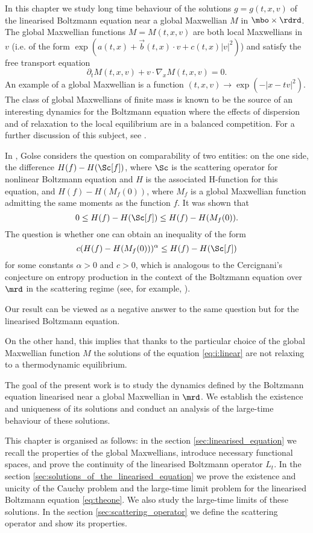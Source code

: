 In this chapter we study long time behaviour of the solutions $g=g(t,x,v)$ of the linearised Boltzmann equation near a global Maxwellian $M$ in $\mbo\times\rdrd$. The global Maxwellian functions $M=M(t,x,v)$ are both local Maxwellians in $v$ (i.e. of the form $\exp (a(t,x)+\vec b(t,x)\cdot v + c(t,x)|v|^2)$) and satisfy the free transport equation \[\partial_t M(t,x,v)+v\cdot\nabla_x M(t,x,v)=0.\]
An example of a global Maxwellian is a function $(t,x,v)\to \exp(-|x-tv|^2)$.
The class of global Maxwellians of finite mass is known to be the source of an interesting dynamics for the Boltzmann equation where the effects of dispersion and of relaxation to the local equilibrium are in a balanced competition. For a further discussion of this subject, see \cite{FG}. 


In \cite{Golse2015Dispersion}, Golse considers the question on comparability of two entities: on the one side, the difference $H(f)-H(\Sc [f])$, where $\Sc$ is the scattering operator for nonlinear Boltzmann equation and $H$ is the associated H-function for this equation, and $H(f)-H(M_f(0))$, where $M_f$ is a global Maxwellian function admitting the same moments as the function $f$. It was shown that
\[0\le H(f)-H(\Sc[f])\le H(f)-H(M_f(0)).\]
The question is whether one can obtain an inequality of the form 
\[c(H(f)-H(M_f(0)))^\alpha\le H(f)-H(\Sc[f]) \]
for some constants $\alpha>0$ and $c>0$, which is analogous to the Cercignani's conjecture on entropy production in the context of the Boltzmann equation over $\mrd$ in the scattering regime (see, for example, \cite{Villani2008Entropy}).

Our result can be viewed as a negative answer to the same question but for the linearised Boltzmann equation.

On the other hand, this implies that thanks to the particular choice of the global Maxwellian function $M$ the solutions of the equation \eqref{eq:i:linear} are not relaxing to a thermodynamic equilibrium.

The goal of the present work is to study the dynamics defined by the Boltzmann equation linearised near a global Maxwellian in $\mrd$. We establish the existence and uniqueness of its solutions and conduct an analysis of the large-time behaviour of these solutions.

This chapter is organised as follows: in the section \ref{sec:linearised_equation} we recall the properties of the global Maxwellians, introduce necessary functional spaces, and prove the continuity of the linearised Boltzmann operator $L_t$.	In the section \ref{sec:solutions_of_the_linearised_equation} we prove the existence and unicity of the Cauchy problem and the large-time limit problem for the linearised Boltzmann equation \eqref{eq:theone}. We also study the large-time limits of these solutions. In the section \ref{sec:scattering_operator} we define the scattering operator and show its properties.

